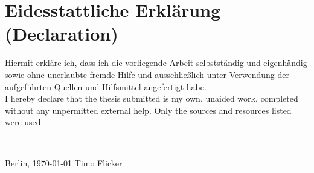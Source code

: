 \chapter*{Eidesstattliche Erklärung (Declaration)}

\thispagestyle{empty}
Hiermit erkläre  ich,  dass  ich  die  vorliegende  Arbeit  selbstständig  und  eigenhändig  sowie  ohne unerlaubte  fremde  Hilfe  und  ausschließlich  unter  Verwendung  der  aufgeführten  Quellen  und Hilfsmittel angefertigt habe.\\

I hereby  declare  that  the  thesis submitted  is  my  own,  unaided work,  completed  without  any unpermitted external help. Only the sources and resources listed were used.\\

\vspace{10 mm}
\begin{flushright}
    \rule{95mm}{1pt}\\
    Berlin, \today \hspace{15 mm} Timo Flicker
\end{flushright}

